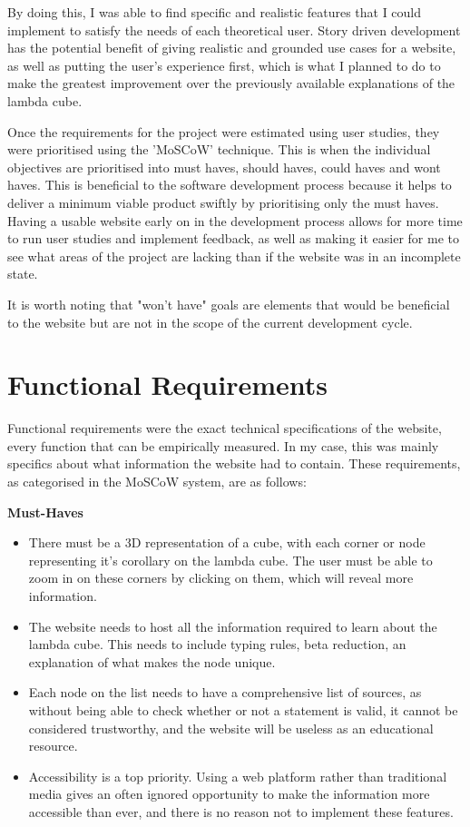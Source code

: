 \documentclass{l4proj}
\begin{document}
By doing this, I was able to find specific and realistic features that I could implement to satisfy the needs of each theoretical user.  Story driven development has the potential benefit of giving realistic and grounded use cases for a website, as well as putting the user's experience first, which is what I planned to do to make the greatest improvement over the previously available explanations of the lambda cube. 

Once the requirements for the project were estimated using user studies, they were prioritised using the 'MoSCoW' technique.  This is when the individual objectives are prioritised into must haves, should haves, could haves and wont haves.  This is beneficial to the software development process because it helps to deliver a minimum viable product swiftly by prioritising only the must haves.  Having a usable website early on in the development process allows for more time to run user studies and implement feedback, as well as making it easier for me to see what areas of the project are lacking than if the website was in an incomplete state.  

It is worth noting that "won't have" goals are elements that would be beneficial to the website but are not in the scope of the current development cycle.

\section{Functional Requirements}

Functional requirements were the exact technical specifications of the website, every function that can be empirically measured.  In my case, this was mainly specifics about what information the website had to contain.  These requirements, as categorised in the MoSCoW system, are as follows:

\textbf{Must-Haves}

\begin{itemize}
    \item There must be a 3D representation of a cube, with each corner or node representing it's corollary on the lambda cube.  The user must be able to zoom in on these corners by clicking on them, which will reveal more information.

    \item The website needs to host all the information required to learn about the lambda cube.  This needs to include typing rules, beta reduction, an explanation of what makes the node unique.

    \item Each node on the list needs to have a comprehensive list of sources, as without being able to check whether or not a statement is valid, it cannot be considered trustworthy, and the website will be useless as an educational resource.

    \item Accessibility is a top priority.  Using a web platform rather than traditional media gives an often ignored opportunity to make the information more accessible than ever, and there is no reason not to implement these features.
    
\end{itemize}
\end{document}
